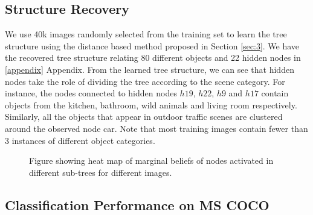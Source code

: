 \documentclass{article}
\begin{document}
\subsection{Structure Recovery}

We use 40k images randomly selected from the training set to learn the tree structure using the distance based method proposed in Section \ref{sec:3}. We have the recovered tree structure relating 80 different objects and 22 hidden nodes in \ref{appendix} Appendix. From the learned tree structure, we can see that hidden nodes take the role of dividing the tree according to the scene category. For instance, the nodes connected to hidden nodes $h19$, $h22$, $h9$ and $h17$  contain objects from the kitchen, bathroom, wild animals and living room respectively. Similarly, all the objects that appear in outdoor traffic scenes are clustered around the observed node car. Note that most training images contain fewer than 3 instances of different object categories.



\begin{figure*}[t]





\caption{Figure showing heat map of marginal beliefs of nodes activated in different sub-trees for different images. }
\end{figure*}



\subsection{Classification Performance on MS COCO}
\end{document}
